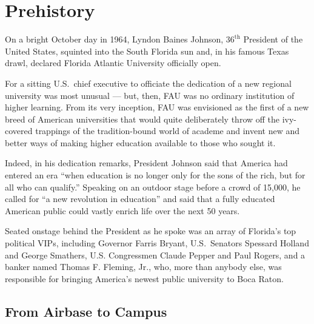 \documentclass[phd, 12pt, print]{fauthesis}
\begin{document}

\tableofcontents
\nolistoftables					%
\listoffigures					%


\mainmatter


\chapter{Prehistory}

On a bright October day in 1964, Lyndon Baines Johnson, $36^{\mathrm{th}}$ President of the United States, squinted into the South Florida sun and, in his famous Texas drawl, declared Florida Atlantic University officially open.

For a sitting U.S.\ chief executive to officiate the dedication of a new regional university was most unusual  ---  but, then, FAU was no ordinary institution of higher learning.  From its very inception, FAU was envisioned as the first of a new breed of American universities that would quite deliberately throw off the ivy-covered trappings of the tradition-bound world of academe and invent new and better ways of making higher education available to those who sought it.

Indeed, in his dedication remarks, President Johnson said that America had entered an era ``when education is no longer only for the sons of the rich, but for all who can qualify.''  Speaking on an outdoor stage before a crowd of 15,000, he called for ``a new revolution in education'' and said that a fully educated American public could vastly enrich life over the next 50 years.

Seated onstage behind the President as he spoke was an array of Florida's top political VIPs, including Governor Farris Bryant, U.S.\ Senators Spessard Holland and George Smathers, U.S. Congressmen Claude Pepper and Paul Rogers, and a banker named Thomas F. Fleming, Jr., who, more than anybody else, was responsible for bringing America's newest public university to Boca Raton.

\section{From Airbase to Campus}
\end{document}
